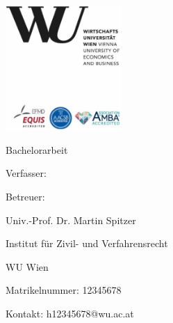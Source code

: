 \begin{titlepage}
    \centering

    \begin{changemargin}{-2cm}{-2cm}
      \begin{flushright}
          \includegraphics[width=4.4cm]{logo}
      \end{flushright}
    \end{changemargin}

    \vspace*{1cm}
    
    \begin{spacing}{1.7}
      {\huge\bfseries \thetitle}
    \end{spacing}

    \vspace*{0.6cm}

    {\Large Bachelorarbeit}

    \vspace*{2cm}

    {\large 
    Verfasser:

    \theauthor

    \vspace*{1cm}

    Betreuer:

    Univ.-Prof. Dr. Martin Spitzer

    Institut für Zivil- und Verfahrensrecht

    WU Wien
    }

    \vfill

    \begin{flushleft}
        Matrikelnummer: 12345678

        Kontakt: h12345678@wu.ac.at
    \end{flushleft}
    
\end{titlepage}
\restoregeometry
